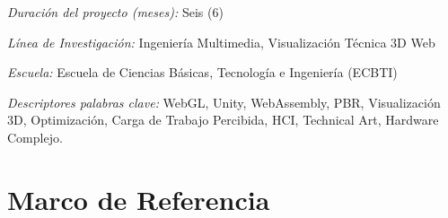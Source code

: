 \documentclass[12pt,letterpaper]{article}
\begin{document}
\textit{Duraci\'on del proyecto (meses):} Seis (6)

\textit{L\'inea de Investigaci\'on:} Ingenier\'ia Multimedia, Visualizaci\'on T\'ecnica 3D Web

\textit{Escuela:} Escuela de Ciencias B\'asicas, Tecnolog\'ia e Ingenier\'ia (ECBTI)

\textit{Descriptores palabras clave:} WebGL, Unity, WebAssembly, PBR, Visualizaci\'on 3D, Optimizaci\'on, Carga de Trabajo Percibida, HCI, Technical Art, Hardware Complejo.

\newpage




\section{Marco de Referencia}







\clearpage

\end{document}
